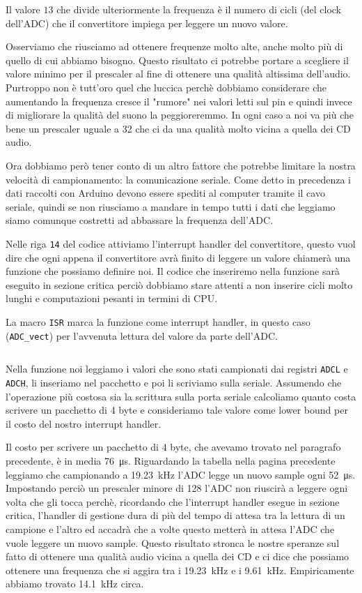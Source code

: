 \documentclass[a4paper,11pt]{article}
\newcommand\source[2]{
	\inputminted[fontsize=\footnotesize,linenos=true,tabsize=4]{#1}{#2}
}
\begin{document}
Il valore $13$ che divide ulteriormente la frequenza è il numero di cicli (del clock dell'ADC) che il convertitore impiega per leggere un nuovo valore.

Osserviamo che riusciamo ad ottenere frequenze molto alte, anche molto più di quello di cui abbiamo bisogno. Questo risultato ci potrebbe portare a scegliere il valore minimo per il prescaler al fine di ottenere una qualità altissima dell'audio. Purtroppo non è tutt'oro quel che luccica perchè dobbiamo considerare che aumentando la frequenza cresce il "rumore" nei valori letti sul pin e quindi invece di migliorare la qualità del suono la peggioreremmo. In ogni caso a noi va più che bene un prescaler uguale a 32 che ci da una qualità molto vicina a quella dei CD audio.

Ora dobbiamo però tener conto di un altro fattore che potrebbe limitare la nostra velocità di campionamento: la comunicazione seriale.
Come detto in precedenza i dati raccolti con Arduino devono essere spediti al computer tramite il cavo seriale, quindi se non riusciamo a mandare in tempo tutti i dati che leggiamo siamo comunque costretti ad abbassare la frequenza dell'ADC.

Nelle riga \texttt{14} del codice attiviamo l'interrupt handler del convertitore, questo vuol dire che ogni appena il convertitore avrà finito di leggere un valore chiamerà una funzione che possiamo definire noi. Il codice che inseriremo nella funzione sarà eseguito in sezione critica perciò dobbiamo stare attenti a non inserire cicli molto lunghi e computazioni pesanti in termini di CPU.

La macro \texttt{ISR} marca la funzione come interrupt handler, in questo caso (\texttt{ADC\_vect}) per l'avvenuta lettura del valore da parte dell'ADC.

\source{cpp}{adc_interrupt_rel}

Nella funzione noi leggiamo i valori che sono stati campionati dai registri \texttt{ADCL} e \texttt{ADCH}, li inseriamo nel pacchetto e poi li scriviamo sulla seriale. Assumendo che l'operazione più costosa sia la scrittura sulla porta seriale calcoliamo quanto costa scrivere un pacchetto di 4 byte e consideriamo tale valore come lower bound per il costo del nostro interrupt handler.

Il costo per scrivere un pacchetto di 4 byte, che avevamo trovato nel paragrafo precedente, è in media \SI{76}{\micro\second}. Riguardando la tabella nella pagina precedente leggiamo che campionando a \SI{19.23}{\kilo\hertz} l'ADC legge un nuovo sample ogni \SI{52}{\micro\second}. Impostando perciò un prescaler minore di 128 l'ADC non riuscirà a leggere ogni volta che gli tocca perchè, ricordando che l'interrupt handler esegue in sezione critica, l'handler di gestione dura di più del tempo di attesa tra la lettura di un campione e l'altro ed accadrà che a volte questo metterà in attesa l'ADC che vuole leggere un nuovo sample.
Questo risultato stronca le nostre speranze sul fatto di ottenere una qualità audio vicina a quella dei CD e ci dice che possiamo ottenere una frequenza che si aggira tra i \SI{19.23}{\kilo\hertz} e i \SI{9.61}{\kilo\hertz}. Empiricamente abbiamo trovato \SI{14.1}{\kilo\hertz} circa.
\end{document}
